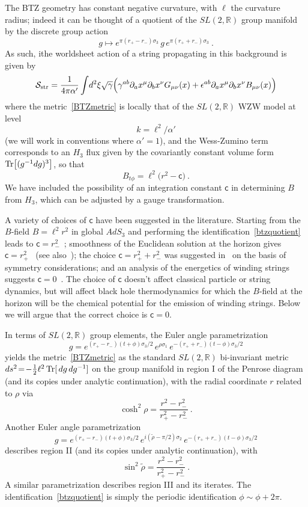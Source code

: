 \documentclass[11pt]{article}
\newcommand{\rcite}{\cite}
\def\str{{\rm str}}
\def\sltwo{\ensuremath{SL(2,\bR)}}
\def\tight#1{\! #1 \!}  %
\def\sfc{{\mathsf c}}
\def\half{\frac12}
\def\tr{{\rm Tr}}
\def\Tr{{\rm Tr}}
\def\be{\begin{equation}}
\def\ee{\end{equation}}
\newcommand{\bR}{{\mathbb R}}
\numberwithin{equation}{section}
\def\cS{\mathcal {S}} \def\cT{\mathcal {T}} \def\cU{\mathcal {U}}
\def\half{\frac12}
\begin{document}
The BTZ geometry has constant negative curvature, with $\ell$ the curvature radius; indeed it can be thought of a quotient of the $\sltwo$ group manifold by the discrete group action
\be
\label{btzquotient}
g \mapsto e^{\pi(r_+-r_-)\sigma_3} \,g\, e^{\pi(r_++r_-)\sigma_3}  ~.
\ee
As such, ithe worldsheet action of a string propagating in this background is given by
\be
\label{Sstr}
\cS_\str = \frac{1}{4\pi \alpha'} \int\!d^2\xi \sqrt{\gamma}\Big(\gamma^{ab} \partial_a x^\mu\partial_bx^\nu G_{\mu\nu}(x)
+ \epsilon^{ab} \partial_ax^\mu\partial_bx^\nu B_{\mu\nu}(x) \Big)
\ee
where the metric~\eqref{BTZmetric} is locally that of the $\sltwo$ WZW model at level 
\be
\label{level}
k=\ell^2/\alpha'
\ee
(we will work in conventions where $\alpha'=1$),
and the Wess-Zumino term corresponds to an $H_3$ flux given by the covariantly constant volume form 
$\Tr\big[(g^{-1}dg)^3\big]$, 
so that
\be
\label{Bfield}
B_{t\phi} =  \ell^2\big( r^2-\sfc\big) ~.
\ee
We have included the possibility of an integration constant $\sfc$ in determining $B$ from $H_3$, which can be adjusted by a gauge transformation.  

A variety of choices of $\sfc$ have been suggested in the literature.  Starting from the $B$-field $B=\ell^2r^2$ in global $AdS_3$ and performing the identification~\eqref{btzquotient} leads to $\sfc=r_-^2$~\rcite{Hemming:2001we,Hemming:2002kd};
smoothness of the Euclidean solution at the horizon gives $\sfc=r_+^2$~\rcite{Ashok:2021ffx} (see also~\rcite{Rangamani:2007fz});
the choice $\sfc=r_+^2+r_-^2$ was suggested in~\rcite{Nippanikar:2021skr} on the basis of symmetry considerations; and
an analysis of the energetics of winding strings suggests $\sfc=0$~\rcite{Ashok:2021ffx}.  The choice of $\sfc$ doesn't affect classical particle or string dynamics, but will affect black hole thermodynamics for which the $B$-field at the horizon will be the chemical potential for the emission of winding strings.  Below we will argue that the correct choice is $\sfc=0$.



In terms of $\sltwo$ group elements, the Euler angle parametrization
\be
\label{euler}
g = e^{(r_+-r_-)(t+\phi){\sigma_3}/{2}}\, e^{\rho \sigma_1}\, e^{-(r_++r_-)(t-\phi)\sigma_3/2}  
\ee
yields the metric~\eqref{BTZmetric} as the standard $\sltwo$ bi-invariant metric $ds^2 \tight= -\half{\ell^2}\, \tr[\,dg \, dg^{-1}]$ on the group manifold in region I of the Penrose diagram (and its copies under analytic continuation), with the radial coordinate $r$ related to $\rho$ via
\be
\cosh^2\rho = \frac{r^2-r_-^2}{r_+^2-r_-^2}  ~.
\ee
Another Euler angle parametrization 
\be
g = e^{(r_+-r_-)(t+\phi){\sigma_3}/{2}}\, e^{i(\tilde\rho-\pi/2) \sigma_2}\, e^{-(r_++r_-)(t-\phi)\sigma_3/2} 
\ee
describes region II (and its copies under analytic continuation), with 
\be
\sin^2\tilde\rho = \frac{r^2-r_-^2}{r_+^2-r_-^2} ~.
\ee
A similar parametrization describes region III and its iterates.   
The identification~\eqref{btzquotient} is simply the periodic identification $\phi\sim\phi+2\pi$.
\end{document}

